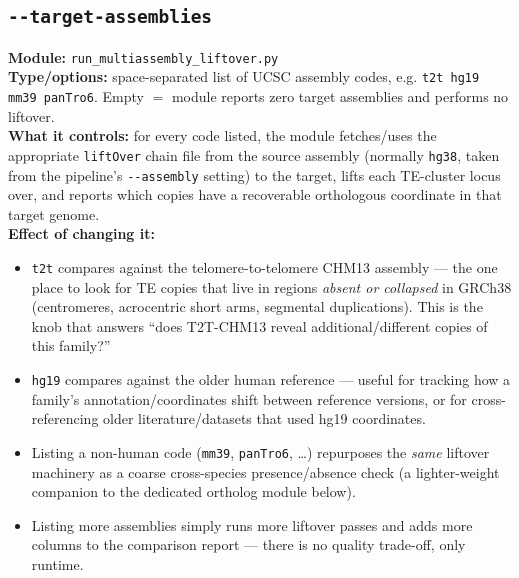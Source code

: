 \documentclass[11pt]{article}
\newcommand{\flag}[1]{\texttt{-\/-#1}}
\newcommand{\param}[1]{\subsection*{\texttt{-\/-#1}}}
\begin{document}
\param{target-assemblies}
\textbf{Module:} \texttt{run\_multiassembly\_liftover.py}\\
\textbf{Type/options:} space-separated list of UCSC assembly codes, e.g.
\texttt{t2t hg19 mm39 panTro6}. Empty $=$ module reports zero target assemblies and
performs no liftover.\\
\textbf{What it controls:} for every code listed, the module fetches/uses the
appropriate \texttt{liftOver} chain file from the source assembly (normally
\texttt{hg38}, taken from the pipeline's \flag{assembly} setting) to the target, lifts
each TE-cluster locus over, and reports which copies have a recoverable orthologous
coordinate in that target genome.\\
\textbf{Effect of changing it:}
\begin{itemize}[leftmargin=1.4em,topsep=2pt,itemsep=2pt]
  \item \texttt{t2t} compares against the telomere-to-telomere CHM13 assembly — the
    one place to look for TE copies that live in regions \emph{absent or collapsed} in
    GRCh38 (centromeres, acrocentric short arms, segmental duplications). This is the
    knob that answers ``does T2T-CHM13 reveal additional/different copies of this
    family?''
  \item \texttt{hg19} compares against the older human reference — useful for tracking
    how a family's annotation/coordinates shift between reference versions, or for
    cross-referencing older literature/datasets that used hg19 coordinates.
  \item Listing a non-human code (\texttt{mm39}, \texttt{panTro6}, \ldots) repurposes
    the \emph{same} liftover machinery as a coarse cross-species presence/absence check
    (a lighter-weight companion to the dedicated ortholog module below).
  \item Listing more assemblies simply runs more liftover passes and adds more columns
    to the comparison report — there is no quality trade-off, only runtime.
\end{itemize}
\end{document}
